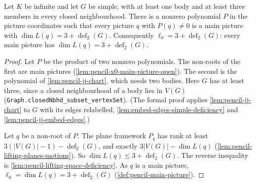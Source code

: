 \begin{theorem}
  \label{thm:pencil-jj-equality}
  \leanok
  Let $K$ be infinite and let $G$ be simple, with at least one body and
  at least three members in every closed neighbourhood. There is a
  nonzero polynomial $P$ in the picture coordinates such that every
  picture $q$ with $P(q) \ne 0$ is a main picture with
  $\dim L(q) = 3 + \operatorname{def}_2(G)$. Consequently
  $\ell_0 = 3 + \operatorname{def}_2(G)$: every main picture has
  $\dim L(q) = 3 + \operatorname{def}_2(G)$.
\end{theorem}
\begin{proof}
  \leanok
  Let $P$ be the product of two nonzero polynomials. The non-roots of the
  first are main pictures (\cref{lem:pencil-x0-main-picture-open}). The
  second is the polynomial of \cref{lem:pencil-jj-chart}, which needs two
  bodies. Here $G$ has at least three, since a closed neighbourhood of a
  body lies in $V(G)$
  (\texttt{Graph.\allowbreak{}closedNbhd\_\allowbreak{}subset\_\allowbreak{}vertexSet}).
  (The formal proof applies \cref{lem:pencil-jj-chart}
  to $G$ with its edges relabelled, \cref{lem:embed-edges-simple-deficiency}
  and \cref{lem:pencil-jj-embed-edges}.)

  Let $q$ be a non-root of $P$. The plane framework $P_q$ has rank at
  least $3(|V(G)| - 1) - \operatorname{def}_2(G)$, and exactly
  $3|V(G)| - \dim L(q)$ (\cref{lem:pencil-lifting-planes-motions}). So
  $\dim L(q) \le 3 + \operatorname{def}_2(G)$. The reverse inequality is
  \cref{lem:pencil-lifting-space-deficiency}. As $q$ is a main picture,
  $\ell_0 = \dim L(q) = 3 + \operatorname{def}_2(G)$
  (\cref{def:pencil-main-picture}).
\end{proof}


